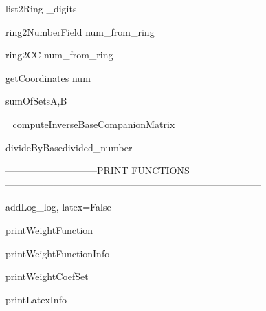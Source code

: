 \begin{method}{list2Ring}{ \_digits}

\end{method}


\begin{method}{ring2NumberField}{ num\_from\_ring}

\end{method}


\begin{method}{ring2CC}{ num\_from\_ring}

\end{method}


\begin{method}{getCoordinates}{ num}

\end{method}


\begin{method}{sumOfSets}{A,B}

\end{method}


\begin{method}{\_computeInverseBaseCompanionMatrix}{}

\end{method}


\begin{method}{divideByBase}{divided\_number}

\end{method}


-----------------------------PRINT FUNCTIONS--------------------------------------------------------------------------------

\begin{method}{addLog}{\_log, latex=False}

\end{method}


\begin{method}{printWeightFunction}{}

\end{method}


\begin{method}{printWeightFunctionInfo}{}

\end{method}


\begin{method}{printWeightCoefSet}{}

\end{method}


\begin{method}{printLatexInfo}{}

\end{method}


